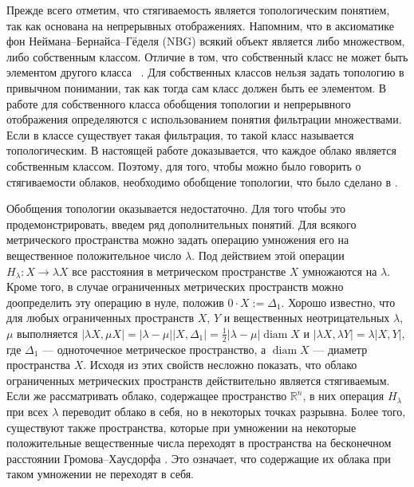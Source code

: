 \documentclass[11pt,twoside,draft
]{article}
\DeclareMathOperator{\diam}{diam}
\begin{document}
Прежде всего отметим, что стягиваемость является топологическим понятием, так как основана на непрерывных отображениях. Напомним, что в аксиоматике фон Неймана--Бернайса--Гёделя (NBG) всякий объект является либо множеством, либо собственным классом.
Отличие в том, что собственный класс не может быть элементом другого класса ~\cite{Neumann, Bernays, Godel}. Для собственных классов нельзя задать топологию в привычном понимании, так как тогда сам класс должен быть ее элементом. 
В работе \cite{BorIvTuzh1}
для собственного класса обобщения топологии и непрерывного отображения определяются с использованием понятия фильтрации множествами. 
Если в классе существует такая фильтрация, то такой класс называется топологическим. 
В настоящей работе доказывается, что каждое облако является собственным классом. Поэтому, для того, чтобы можно было говорить о стягиваемости облаков, необходимо обобщение топологии, что было сделано в \cite{BorIvTuzh1}.

Обобщения топологии оказывается недостаточно. Для того чтобы это продемонстрировать, введем ряд дополнительных понятий.
Для всякого метрического пространства можно задать операцию умножения его на вещественное положительное число $\lambda$. 
Под действием этой операции $H_\lambda\colon X \rightarrow \lambda X$ все расстояния в метрическом пространстве $X$ умножаются на $\lambda$.
Кроме того, в случае ограниченных метрических пространств можно доопределить эту операцию в нуле, положив $0\cdot X := \Delta_1$.
Хорошо известно, что для любых  ограниченных пространств $X$, $ Y$ и вещественных неотрицательных $\lambda$, $\mu$ выполняется $|\lambda X, \mu X| = |\lambda - \mu|\left|X,\Delta_1\right| = \frac  1 2 |\lambda - \mu|\diam X$ и $|\lambda X, \lambda Y| = \lambda |X,Y|$, где $\Delta_1$ --- одноточечное метрическое пространство, а $\diam X$ --- диаметр пространства $X$. 
Исходя из этих свойств несложно показать, что облако ограниченных метрических пространств действительно является стягиваемым. 
Если же рассматривать облако, содержащее пространство $\mathbb{R}^n$, в них операция $H_\lambda$ при всех $\lambda$ переводит облако в себя, но в некоторых точках разрывна.
Более того, существуют также пространства, которые при умножении на некоторые положительные вещественные числа переходят в пространства на бесконечном расстоянии Громова--Хаусдорфа \cite{TuzhBog1}. Это означает, что содержащие их облака при таком умножении не переходят в себя. 
\end{document}
